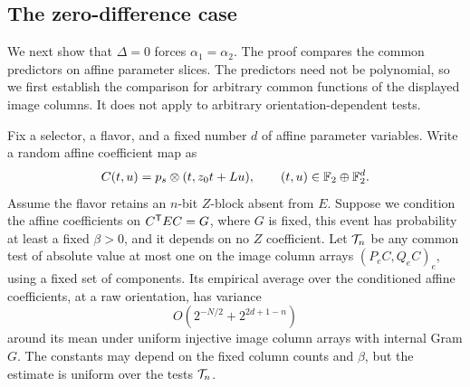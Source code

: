 \subsection{The zero-difference case}

We next show that \(\Delta=0\) forces \(\alpha_1=\alpha_2\).
The proof compares the common predictors on affine parameter slices.
The predictors need not be polynomial, so we first establish the
comparison for arbitrary common functions of the displayed image
columns. It does not apply to arbitrary orientation-dependent tests.

\begin{lemma}
\label{lem:synthetic-slice}
Fix a selector, a flavor, and a fixed number \(d\) of affine
parameter variables.  Write a random affine coefficient map as
\[
 C(t,u)=p_s\otimes(t,z_0t+Lu),
 \qquad (t,u)\in\mathbb F_2\oplus\mathbb F_2^d.
 \]
Assume the flavor retains an \(n\)-bit \(Z\)-block absent from
\(E\).  Suppose we condition the affine coefficients on
\(C^{\mathsf T} EC=G\), where \(G\) is fixed, this event has probability
at least a fixed \(\beta>0\), and it depends on no \(Z\)
coefficient.
Let \({\cal T}_n\) be any common test of absolute value at most
one on the image column arrays \((P_eC,Q_eC)_e\), using a fixed
set of components.  Its empirical average over the conditioned
affine coefficients, at a raw orientation, has variance
\[
 O(2^{-N/2}+2^{2d+1-n})
 \]
around its mean under uniform injective image column arrays
with internal Gram \(G\).
The constants may depend on the fixed column counts and
\(\beta\), but the estimate is uniform over the tests
\({\cal T}_n\).
\end{lemma}

